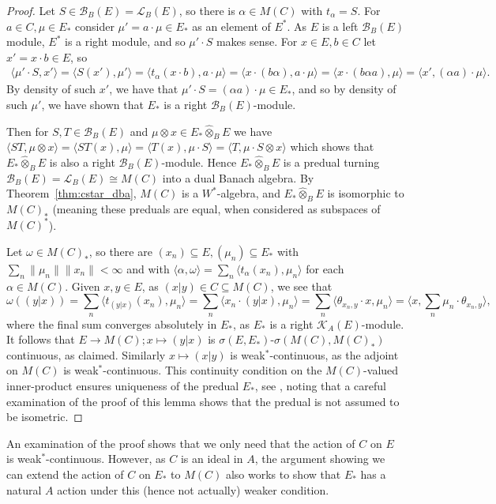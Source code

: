 \documentclass[a4paper,11pt]{article}
\theoremstyle{plain}
\theoremstyle{remark}
\newenvironment{remark}
  {\pushQED{\qed}\renewcommand{\qedsymbol}{$\triangle$}\remarkx}
  {\popQED\endremarkx}
\newcommand{\mc}[1]{\mathcal{#1}}
\newcommand{\ip}[2]{{\langle {#1} , {#2} \rangle}}
\newcommand{\proten}{\widehat\otimes}
\begin{document}
\begin{proof}
Let $S\in\mc B_B(E) = \mc L_B(E)$, so there is $\alpha\in M(C)$ with $t_\alpha = S$.  For $a\in C, \mu\in E_*$ consider $\mu' = a\cdot \mu \in E_*$ as an element of $E^*$.  As $E$ is a left $\mc B_B(E)$ module, $E^*$ is a right module, and so $\mu'\cdot S$ makes sense.  For $x\in E, b\in C$ let $x' = x\cdot b\in E$, so
\begin{align*}
\ip{\mu'\cdot S}{x'} = \ip{S(x')}{\mu'} = \ip{t_\alpha(x\cdot b)}{a\cdot\mu} = \ip{x\cdot(b \alpha)}{a\cdot\mu}
= \ip{x\cdot(b\alpha a)}{\mu}
= \ip{x'}{(\alpha a)\cdot \mu}.
\end{align*}
By density of such $x'$, we have that $\mu'\cdot S = (\alpha a)\cdot \mu \in E_*$, and so by density of such $\mu'$, we have shown that $E_*$ is a right $\mc B_B(E)$-module.

Then for $S, T \in\mc B_B(E)$ and $\mu\otimes x \in E_* \proten_B E$ we have $\ip{ST}{\mu\otimes x} = \ip{ST(x)}{\mu} = \ip{T(x)}{\mu\cdot S} = \ip{T}{\mu\cdot S \otimes x}$ which shows that $E_* \proten_B E$ is also a right $\mc B_B(E)$-module.  Hence $E_* \proten_B E$ is a predual turning $\mc B_B(E) = \mc L_B(E) \cong M(C)$ into a dual Banach algebra.  By Theorem~\ref{thm:cstar_dba}, $M(C)$ is a $W^*$-algebra, and $E_* \proten_B E$ is isomorphic to $M(C)_*$ (meaning these preduals are equal, when considered as subspaces of $M(C)^*$).

Let $\omega \in M(C)_*$, so there are $(x_n)\subseteq E, (\mu_n)\subseteq E_*$ with $\sum_n \|\mu_n\| \|x_n\| < \infty$ and with $\ip{\alpha}{\omega} = \sum_n \ip{t_\alpha(x_n)}{\mu_n}$ for each $\alpha \in M(C)$.  Given $x,y\in E$, as $(x|y)\in C \subseteq M(C)$, we see that
\[ \omega((y|x))
= \sum_n \ip{t_{(y|x)}(x_n)}{\mu_n} 
= \sum_n \ip{x_n \cdot (y|x)}{\mu_n} 
= \sum_n \ip{\theta_{x_n, y} \cdot x}{\mu_n} 
= \ip{x}{\sum_n \mu_n \cdot \theta_{x_n, y}}, \]
where the final sum converges absolutely in $E_*$, as $E_*$ is a right $\mc K_A(E)$-module.  It follows that $E \to M(C); x \mapsto (y|x)$ is $\sigma(E, E_*)$-$\sigma(M(C), M(C)_*)$ continuous, as claimed.  Similarly $x\mapsto (x|y)$ is weak$^*$-continuous, as the adjoint on $M(C)$ is weak$^*$-continuous.  This continuity condition on the $M(C)$-valued inner-product ensures uniqueness of the predual $E_*$, see \cite[Lemma~8.5.4]{BlecherLeMerdy_Book}, noting that a careful examination of the proof of this lemma shows that the predual is not assumed to be isometric.
\end{proof}

\begin{remark}
An examination of the proof shows that we only need that the action of $C$ on $E$ is weak$^*$-continuous.  However, as $C$ is an ideal in $A$, the argument showing we can extend the action of $C$ on $E_*$ to $M(C)$ also works to show that $E_*$ has a natural $A$ action under this (hence not actually) weaker condition.
\end{remark}
\end{document}
